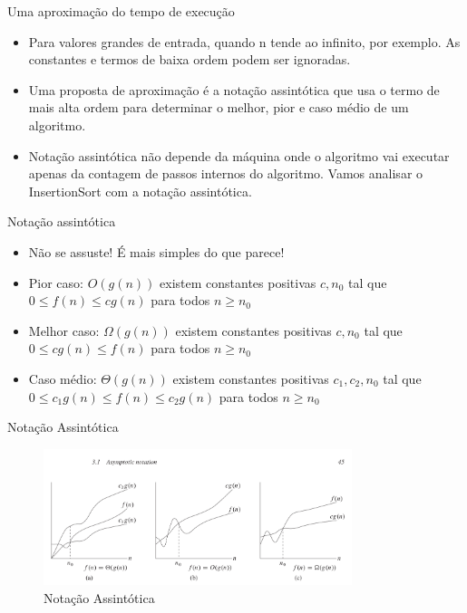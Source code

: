 \begin{frame}
\begin{block}{Uma aproximação do tempo de execução}
	\begin{itemize}
		\item Para valores grandes de entrada, quando n tende ao infinito, por exemplo. As constantes e termos de baixa ordem podem ser ignoradas.
		
		\item Uma proposta de aproximação é a notação assintótica que usa o termo de mais alta ordem para determinar o melhor, pior e caso médio de um algoritmo.
				
		\item Notação assintótica não depende da máquina onde o algoritmo vai executar apenas da contagem de passos internos do algoritmo.  Vamos analisar o InsertionSort com a notação assintótica.
		
	\end{itemize}
\end{block}
\end{frame}


\begin{frame}
\begin{block}{Notação assintótica}
	\begin{itemize}
		\item Não se assuste! É mais simples do que parece!

		\item Pior caso: $O(g(n))$ existem constantes positivas $c, n_0$ tal que $0 \leq f(n)  \leq cg(n)$ para todos $n \geq n_0$
				
		\item Melhor caso: $\Omega(g(n))$ existem constantes positivas $c, n_0$ tal que $0 \leq cg(n) \leq f(n)$ para todos $n \geq n_0$
				
		\item Caso médio: $\Theta(g(n))$ existem constantes positivas $c_1, c_2, n_0$ tal que $0 \leq c_1g(n) \leq f(n) \leq c_2g(n)$ para todos $n \geq n_0$
	\end{itemize}
\end{block}
\end{frame}

\begin{frame}	
	\begin{block}{Notação Assintótica}	
		 \begin{figure}[!htb]
			\centering	  				
			\includegraphics[height=4cm, width = 9cm]{./pic/analiseAssintotica.png}
			\caption{Notação Assintótica}
			\label{fig_analise_assintotica}
		\end{figure}
	\end{block}
\end{frame}


